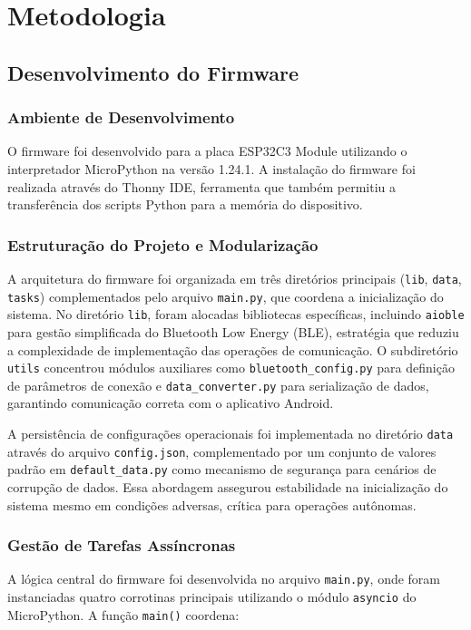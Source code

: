 \chapter{Metodologia}

\section{Desenvolvimento do Firmware}
\subsection{Ambiente de Desenvolvimento}
O firmware foi desenvolvido para a placa ESP32C3 Module utilizando o interpretador MicroPython na versão 1.24.1. A instalação do firmware foi realizada através do Thonny IDE, ferramenta que também permitiu a transferência dos scripts Python para a memória do dispositivo.

\subsection{Estruturação do Projeto e Modularização}
A arquitetura do firmware foi organizada em três diretórios principais (\texttt{lib}, \texttt{data}, \texttt{tasks}) complementados pelo arquivo \texttt{main.py}, que coordena a inicialização do sistema. No diretório \texttt{lib}, foram alocadas bibliotecas específicas, incluindo \texttt{aioble} para gestão simplificada do Bluetooth Low Energy (BLE), estratégia que reduziu a complexidade de implementação das operações de comunicação. O subdiretório \texttt{utils} concentrou módulos auxiliares como \texttt{bluetooth\_config.py} para definição de parâmetros de conexão e \texttt{data\_converter.py} para serialização de dados, garantindo comunicação correta com o aplicativo Android.

A persistência de configurações operacionais foi implementada no diretório \texttt{data} através do arquivo \texttt{config.json}, complementado por um conjunto de valores padrão em \texttt{default\_data.py} como mecanismo de segurança para cenários de corrupção de dados. Essa abordagem assegurou estabilidade na inicialização do sistema mesmo em condições adversas, crítica para operações autônomas.

\subsection{Gestão de Tarefas Assíncronas}
A lógica central do firmware foi desenvolvida no arquivo \texttt{main.py}, onde foram instanciadas quatro corrotinas principais utilizando o módulo \texttt{asyncio} do MicroPython. A função \texttt{main()} coordena:

